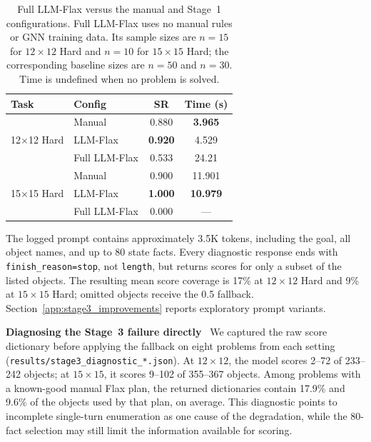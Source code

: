 \documentclass{ieeeaccess}
\newcommand{\sref}[1]{Section~\ref{#1}}
\newcommand{\myparagraph}[1]{\noindent\textbf{#1}~}
\newcommand{\method}{LLM-Flax\xspace}
\newcommand{\fullmethod}{Full LLM-Flax\xspace}
\begin{document}
\begin{table}[h]
    \centering
    \caption{\fullmethod versus the manual and Stage~1 configurations. \fullmethod uses no manual rules or GNN training data. Its sample sizes are $n{=}15$ for $12{\times}12$ Hard and $n{=}10$ for $15{\times}15$ Hard; the corresponding baseline sizes are $n{=}50$ and $n{=}30$. Time is undefined when no problem is solved.}
    \label{tab:stage3}
    \small
    \setlength{\tabcolsep}{4pt}
    \renewcommand{\arraystretch}{1.1}
    \begin{tabular}{llcc}
        \toprule
        \textbf{Task} & \textbf{Config} & \textbf{SR} & \textbf{Time (s)} \\
        \midrule
        \multirow{3}{*}{12$\times$12 Hard}
            & Manual              & 0.880          & \textbf{3.965} \\
            & \method             & \textbf{0.920} & 4.529 \\
            & \fullmethod         & 0.533          & 24.21 \\
        \midrule
        \multirow{3}{*}{15$\times$15 Hard}
            & Manual              & 0.900          & 11.901 \\
            & \method             & \textbf{1.000} & \textbf{10.979} \\
            & \fullmethod         & 0.000          & --- \\
        \bottomrule
    \end{tabular}
\end{table}

The logged prompt contains approximately 3.5K tokens, including the goal, all object names, and up to 80 state facts. Every diagnostic response ends with \texttt{finish\_reason=stop}, not \texttt{length}, but returns scores for only a subset of the listed objects.
The resulting mean score coverage is 17\% at $12{\times}12$ Hard and 9\% at $15{\times}15$ Hard; omitted objects receive the 0.5 fallback. \sref{app:stage3_improvements} reports exploratory prompt variants.

\myparagraph{Diagnosing the Stage~3 failure directly}
\label{sec:stage3_diagnosis}
We captured the raw score dictionary before applying the fallback on eight problems from each setting (\texttt{results/stage3\_diagnostic\_*.json}). At $12{\times}12$, the model scores 2--72 of 233--242 objects; at $15{\times}15$, it scores 9--102 of 355--367 objects.
Among problems with a known-good manual Flax plan, the returned dictionaries contain 17.9\% and 9.6\% of the objects used by that plan, on average. This diagnostic points to incomplete single-turn enumeration as one cause of the degradation, while the 80-fact selection may still limit the information available for scoring.
\end{document}
